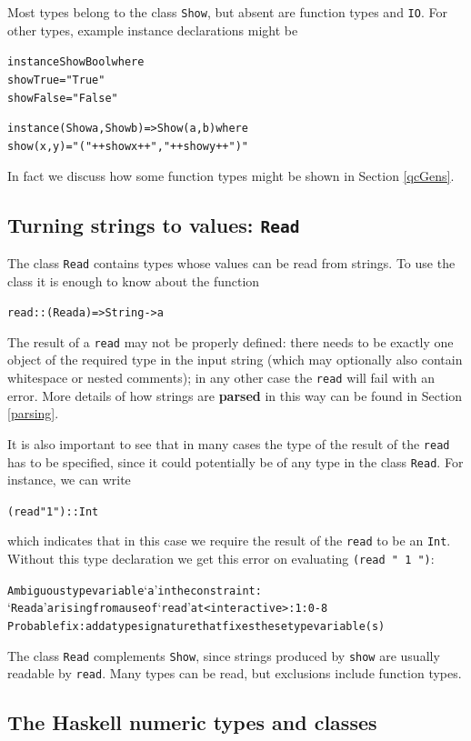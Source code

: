 Most types belong to the class \texttt{Show}, but absent are function types and \texttt{IO}. For other types, example instance declarations might be
\begin{alltt}
instance Show Bool where
   show True  = "True"
   show False = "False"

instance (Show a, Show b) => Show (a,b) where
   show (x,y) = "(" ++ show x ++ "," ++ show y ++ ")"
\end{alltt}
In fact we discuss how some function types might be shown in Section \ref{qcGens}.


\subsection*{Turning strings to values: \texttt{Read}}

The class \texttt{Read}
contains types whose values can be read from
strings. To use the class it is enough to know about the function
\begin{alltt}
read :: (Read a) => String -> a
\end{alltt}
The result of a
\texttt{read} may not be properly defined: there needs to be exactly one object
of the required type in the input string (which may optionally also contain
whitespace or nested
comments); in any other case the \texttt{read} will fail with an error. More
details of how strings are \textbf{parsed} in this way can be found in Section
\ref{parsing}.

It is also important to see that
in many cases the type of the result of the \texttt{read} has to be
specified, since it could potentially be of any type in the class \texttt{Read}.
For instance, we can write
\begin{alltt}
(read " 1 ") :: Int
\end{alltt}
which indicates
that in this case we require the result of the \texttt{read} to be
an \texttt{Int}. Without this type declaration we get this error on evaluating \texttt{(read " 1 ")}:
\begin{alltt}
Ambiguous type variable `a' in the constraint:
  `Read a' arising from a use of `read' at <interactive>:1:0-8
Probable fix: add a type signature that fixes these type variable(s)
\end{alltt}
The class \texttt{Read} complements \texttt{Show}, since strings produced
by \texttt{show} are usually readable by \texttt{read}. Many types can be read, but
exclusions include function types.

\subsection*{The Haskell numeric types and classes}

